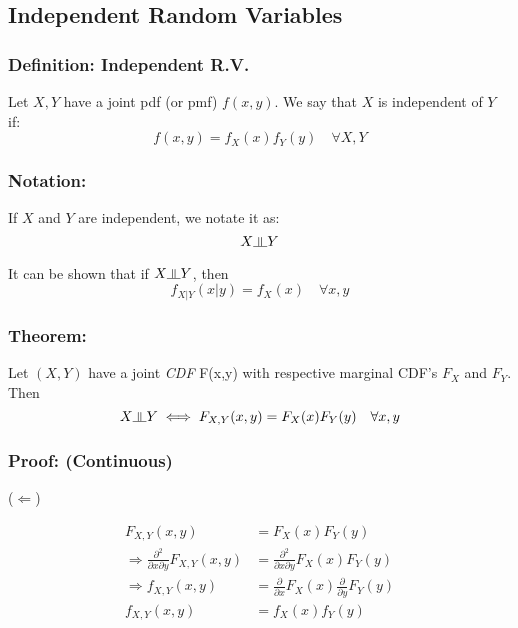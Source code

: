 \documentclass{article}
\newcommand{\indep}{\rotatebox[origin=c]{90}{$\models$}}
\begin{document}
\subsection{Independent Random Variables}

\subsubsection*{Definition: Independent R.V.}

Let $X,Y$ have a joint pdf (or pmf) $f(x,y)$. We say that $X$ is independent of $Y$ if:
\begin{equation*}
    f(x,y) = f_X(x) f_Y(y) \quad \forall X,Y
\end{equation*}

\subsubsection*{Notation:}
If $X$ and $Y$ are independent, we notate it as:
\begin{equation*}
    X \indep Y
\end{equation*}

It can be shown that if $X \indep Y$, then
\begin{equation*}
    f_{X|Y}(x|y) = f_X(x) \quad \forall x,y
\end{equation*}

\subsubsection*{Theorem:}
Let $(X,Y)$ have a joint \textit{CDF} F(x,y) with respective marginal CDF's $F_X$ and $F_Y$. Then
\begin{equation*}
    X \indep Y \iff F_{X,Y}(x,y) = F_X(x) F_Y(y) \quad \forall x,y
\end{equation*}

\subsubsection*{Proof: (Continuous)}

($\Leftarrow$)

\begin{equation*}
\begin{split}
    F_{X,Y}(x,y) &= F_X(x) F_Y(y)\\
    \Rightarrow \frac{\partial^2}{\partial x \partial y} F_{X,Y}(x,y) &= \frac{\partial^2}{\partial x \partial y} F_X(x) F_Y(y)\\
    \Rightarrow f_{X,Y}(x,y) &= \frac{\partial}{\partial x} F_X(x) \frac{\partial}{\partial y} F_Y(y)\\
    f_{X,Y}(x,y) &= f_X(x) f_Y(y)
\end{split}
\end{equation*}
\end{document}
